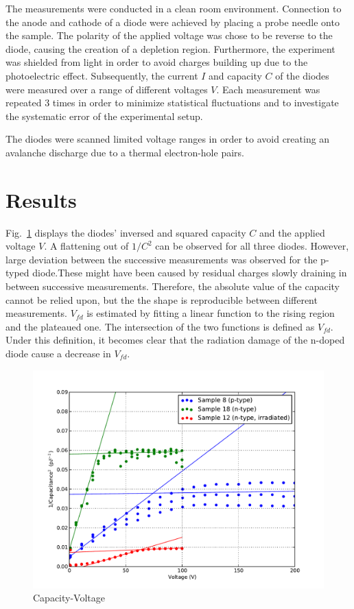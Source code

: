 \documentclass[11pt]{article}
\begin{document}
The measurements were conducted in a clean room environment. 
Connection to the anode and cathode of a diode were achieved by placing a probe needle onto the sample.
The polarity of the applied voltage was chose to be reverse to the diode, causing the creation of a depletion region.
Furthermore, the experiment was shielded from light in order to avoid charges building up due to the photoelectric effect. Subsequently, the current $I$ and capacity $C$ of the diodes were measured over a range of different voltages $V$. Each measurement was repeated 3 times in order to minimize statistical fluctuations and to investigate the systematic error of the experimental setup.

The diodes were scanned limited voltage ranges in order to avoid creating an avalanche discharge due to a thermal electron-hole pairs.

\section{Results}
Fig.~\ref{fig:cv} displays the  diodes' inversed and squared capacity $C$ and the applied voltage $V$.
A flattening out of $1/C^2$ can be observed for all three diodes.
However, large deviation between the successive measurements was observed for the p-typed diode.These might have been caused by residual charges slowly draining in between successive measurements.
Therefore, the absolute value of the capacity cannot be relied upon, but the the shape is reproducible between different measurements.
$V_{fd}$ is estimated by fitting a linear function to the rising region and the plateaued one. The intersection of the two functions is defined as $V_{fd}$.
Under this definition, it becomes clear that the radiation damage of the n-doped diode cause a decrease in $V_{fd}$.
\label{sec:results}
\begin{figure}
  \centering
  \includegraphics[width=\textwidth]{./figures/cv.pdf}  
  \caption{Capacity-Voltage }
  \label{fig:cv}
\end{figure}
\end{document}
